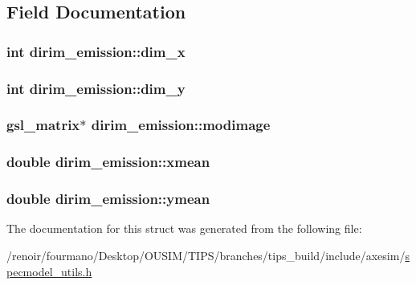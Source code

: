 \subsection{Field Documentation}
\hypertarget{structdirim__emission_a4184a616a68e4d92efee811168b9ab7e}{
\subsubsection[{dim\_\-x}]{\setlength{\rightskip}{0pt plus 5cm}int {\bf dirim\_\-emission::dim\_\-x}}}
\label{structdirim__emission_a4184a616a68e4d92efee811168b9ab7e}
\hypertarget{structdirim__emission_a9b3ba1b1264aaae084c69f290f6343e3}{
\subsubsection[{dim\_\-y}]{\setlength{\rightskip}{0pt plus 5cm}int {\bf dirim\_\-emission::dim\_\-y}}}
\label{structdirim__emission_a9b3ba1b1264aaae084c69f290f6343e3}
\hypertarget{structdirim__emission_a8ae8f988a0ad5d4dd23c294c59e81e0e}{
\subsubsection[{modimage}]{\setlength{\rightskip}{0pt plus 5cm}gsl\_\-matrix$\ast$ {\bf dirim\_\-emission::modimage}}}
\label{structdirim__emission_a8ae8f988a0ad5d4dd23c294c59e81e0e}
\hypertarget{structdirim__emission_a57c2f8cf6dfc3ede582b40f8a63e3eec}{
\subsubsection[{xmean}]{\setlength{\rightskip}{0pt plus 5cm}double {\bf dirim\_\-emission::xmean}}}
\label{structdirim__emission_a57c2f8cf6dfc3ede582b40f8a63e3eec}
\hypertarget{structdirim__emission_a95dcd0f591805409a5667874e771597e}{
\subsubsection[{ymean}]{\setlength{\rightskip}{0pt plus 5cm}double {\bf dirim\_\-emission::ymean}}}
\label{structdirim__emission_a95dcd0f591805409a5667874e771597e}


The documentation for this struct was generated from the following file:\begin{DoxyCompactItemize}
\item 
/renoir/fourmano/Desktop/OUSIM/TIPS/branches/tips\_\-build/include/axesim/\hyperlink{specmodel__utils_8h}{specmodel\_\-utils.h}\end{DoxyCompactItemize}
